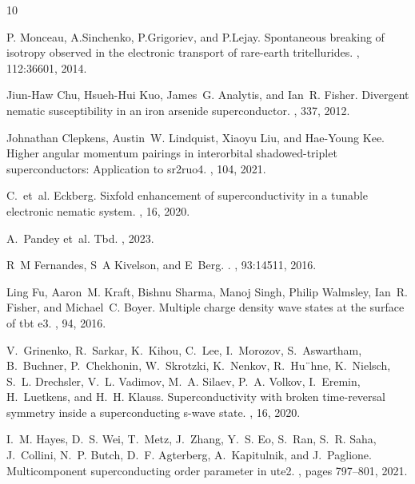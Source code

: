 \documentclass[%
 reprint, %
amsmath,amssymb,
aps,
]{revtex4-2}
\begin{document}
\nocite{*}

\providecommand{\noopsort}[1]{}\providecommand{\singleletter}[1]{#1}%
\begin{thebibliography}{10}

P. Monceau, A.Sinchenko, P.Grigoriev, and P.Lejay.
\newblock Spontaneous breaking of isotropy observed in the electronic transport
  of rare-earth tritellurides.
, 112:36601, 2014.

Jiun-Haw Chu, Hsueh-Hui Kuo, James~G. Analytis, and Ian~R. Fisher.
\newblock Divergent nematic susceptibility in an iron arsenide superconductor.
, 337, 2012.

Johnathan Clepkens, Austin~W. Lindquist, Xiaoyu Liu, and Hae-Young Kee.
\newblock Higher angular momentum pairings in interorbital shadowed-triplet
  superconductors: Application to sr2ruo4.
, 104, 2021.

C.~et~al. Eckberg.
\newblock Sixfold enhancement of superconductivity in a tunable electronic
  nematic system.
, 16, 2020.

A.~Pandey et~al.
\newblock Tbd.
, 2023.

R~M Fernandes, S~A Kivelson, and E~Berg.
.
, 93:14511, 2016.

Ling Fu, Aaron~M. Kraft, Bishnu Sharma, Manoj Singh, Philip Walmsley, Ian~R.
  Fisher, and Michael~C. Boyer.
\newblock Multiple charge density wave states at the surface of tbt e3.
, 94, 2016.

V.~Grinenko, R.~Sarkar, K.~Kihou, C.~Lee, I.~Morozov, S.~Aswartham, B.~Buchner,
  P.~Chekhonin, W.~Skrotzki, K.~Nenkov, R.~Hu¨hne, K.~Nielsch, S.~L.
  Drechsler, V.~L. Vadimov, M.~A. Silaev, P.~A. Volkov, I.~Eremin, H.~Luetkens,
  and H.~H. Klauss.
\newblock Superconductivity with broken time-reversal symmetry inside a
  superconducting s-wave state.
, 16, 2020.

I.~M. Hayes, D.~S. Wei, T.~Metz, J.~Zhang, Y.~S. Eo, S.~Ran, S.~R. Saha,
  J.~Collini, N.~P. Butch, D.~F. Agterberg, A.~Kapitulnik, and J.~Paglione.
\newblock Multicomponent superconducting order parameter in ute2.
, pages 797--801, 2021.


\end{thebibliography}
\end{document}
